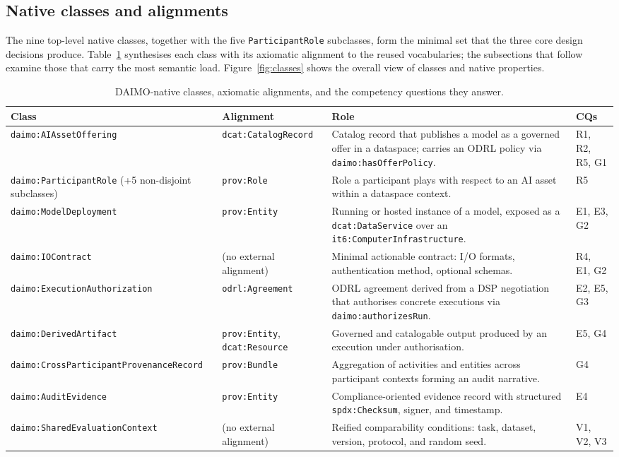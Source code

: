 \documentclass[Afour,sagev,times]{sagej}
\newcommand{\code}[1]{\texttt{#1}}
\begin{document}
\subsection{Native classes and alignments}\label{sec:classes}

The nine top-level native classes, together with the five \code{ParticipantRole} subclasses, form the minimal set that the three core design decisions produce. Table~\ref{tab:classes} synthesises each class with its axiomatic alignment to the reused vocabularies; the subsections that follow examine those that carry the most semantic load. Figure~\ref{fig:classes} shows the overall view of classes and native properties.

\begin{table}[t]
\small\sf\centering
\caption{DAIMO-native classes, axiomatic alignments, and the competency questions they answer.\label{tab:classes}}
\begin{tabular}{@{}p{4cm}p{3cm}p{6cm}p{2.2cm}@{}}
\toprule
\textbf{Class} & \textbf{Alignment} & \textbf{Role} & \textbf{CQs} \\
\midrule
\code{daimo:AIAssetOffering} & \code{dcat:CatalogRecord} & Catalog record that publishes a model as a governed offer in a dataspace; carries an ODRL policy via \code{daimo:hasOfferPolicy}. & R1, R2, R5, G1 \\
\code{daimo:ParticipantRole} \newline (+5 non-disjoint subclasses) & \code{prov:Role} & Role a participant plays with respect to an AI asset within a dataspace context. & R5 \\
\code{daimo:ModelDeployment} & \code{prov:Entity} & Running or hosted instance of a model, exposed as a \code{dcat:DataService} over an \code{it6:ComputerInfrastructure}. & E1, E3, G2 \\
\code{daimo:IOContract} & (no external alignment) & Minimal actionable contract: I/O formats, authentication method, optional schemas. & R4, E1, G2 \\
\code{daimo:ExecutionAuthorization} & \code{odrl:Agreement} & ODRL agreement derived from a DSP negotiation that authorises concrete executions via \code{daimo:authorizesRun}. & E2, E5, G3 \\
\code{daimo:DerivedArtifact} & \code{prov:Entity}, \code{dcat:Resource} & Governed and catalogable output produced by an execution under authorisation. & E5, G4 \\
\code{daimo:CrossParticipantProvenanceRecord} & \code{prov:Bundle} & Aggregation of activities and entities across participant contexts forming an audit narrative. & G4 \\
\code{daimo:AuditEvidence} & \code{prov:Entity} & Compliance-oriented evidence record with structured \code{spdx:Checksum}, signer, and timestamp. & E4 \\
\code{daimo:SharedEvaluationContext} & (no external alignment) & Reified comparability conditions: task, dataset, version, protocol, and random seed. & V1, V2, V3 \\
\bottomrule
\end{tabular}
\end{table}
\end{document}
